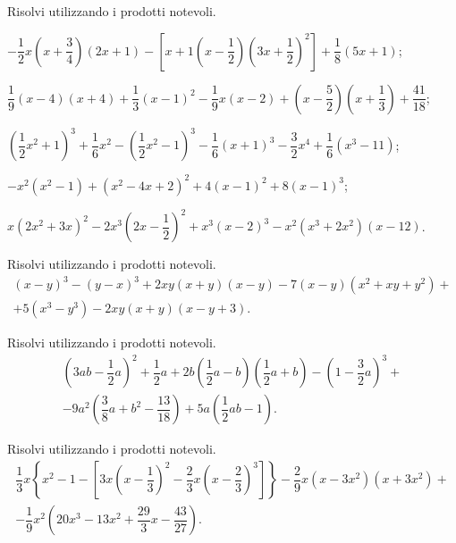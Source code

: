 \begin{esercizio}[\Ast]
Risolvi utilizzando i prodotti notevoli.
 \begin{enumeratea}
 \item $-{\dfrac{1}{2}x}\left(x+\dfrac{3}{4}\right)(2x+1)-\left[x+1\left(x-\dfrac{1}{2}\right)\left(3x+\dfrac{1}{2}\right)^{2}\right]+\dfrac{1}{8}(5x+1)$;
 \item $\dfrac{1}{9}(x-4)(x+4)+\dfrac{1}{3}(x-1)^{2}-\dfrac{1}{9}x(x-2)+\left(x-\dfrac{5}{2}\right)\left(x+\dfrac{1}{3}\right)+\dfrac{41}{18}$;
 \item $\left(\dfrac{1}{2}x^{2}+1\right)^{3}+\dfrac{1}{6}x^{2}-\left(\dfrac{1}{2}x^{2}-1\right)^{3}-\dfrac{1}{6}(x+1)^{3}-\dfrac{3}{2}x^{4}+\dfrac{1}{6}\left(x^3-11\right)$;
 \item $-x^{2}\left(x^{2}-1\right)+\left(x^{2}-4x+2\right)^{2}+4(x-1)^{2}+8(x-1)^{3}$;
 \item $x\left(2x^{2}+3x\right)^{2}-2x^{3}\left(2x-\dfrac{1}{2}\right)^{2}+x^{3}(x-2)^{3}-x^{2}\left(x^{3}+2x^{2}\right)(x-12)$.
 \end{enumeratea}
\end{esercizio}

\begin{esercizio}[\Ast]
Risolvi utilizzando i prodotti notevoli.
\begin{multline*}
(x-y)^{3}-(y-x)^{3}+2{xy}(x+y)(x-y)-7(x-y)\left(x^{2}+{xy}+y^{2}\right)+\\
+5\left(x^{3}-y^{3}\right)-2{xy}(x+y)(x-y+3).
\end{multline*}
\end{esercizio}

\begin{esercizio}[\Ast]
Risolvi utilizzando i prodotti notevoli.
\begin{multline*}
\left(3ab-\dfrac{1}{2}a\right)^{2}+\dfrac{1}{2}a+2b\left(\dfrac{1}{2}a-b\right)\left(\dfrac{1}{2}a+b\right)-\left(1-\dfrac{3}{2}a\right)^{3}+\\
-9a^{2}\left(\dfrac{3}{8}a+b^{2}-\dfrac{13}{18}\right)+5a\left(\dfrac{1}{2}{ab}-1\right).
\end{multline*}
\end{esercizio}

\begin{esercizio}[\Ast]
Risolvi utilizzando i prodotti notevoli.
\begin{multline*}
\dfrac{1}{3}x\left\{x^{2}-1-\left[3x\left(x-\dfrac{1}{3}\right)^{2}-\dfrac{2}{3}x\left(x-\dfrac{2}{3}\right)^{3}\right]\right\}-\dfrac{2}{9}x\left(x-3x^{2}\right)\left(x+3x^{2}\right)+\\
-\dfrac{1}{9}x^{2}\left(20x^{3}-13x^{2}+\dfrac{29}{3}x-\dfrac{43}{27}\right).
\end{multline*}
\end{esercizio}

